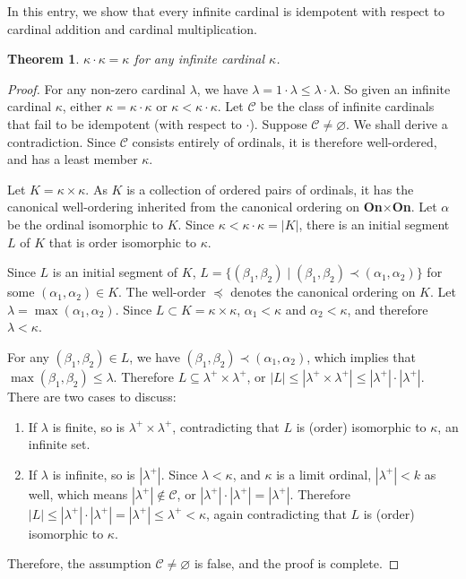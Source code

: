 \documentclass[12pt]{article}
\newtheorem{thm}{Theorem}
\begin{document}
In this entry, we show that every infinite cardinal is idempotent with respect to cardinal addition and cardinal multiplication.

\begin{thm} $\kappa\cdot \kappa = \kappa$ for any infinite cardinal $\kappa$. \end{thm}
\begin{proof} For any non-zero cardinal $\lambda$, we have $\lambda = 1\cdot \lambda \le \lambda \cdot \lambda$.  So given an infinite cardinal $\kappa$, either $\kappa = \kappa\cdot\kappa$ or $\kappa < \kappa \cdot \kappa$.  Let $\mathscr{C}$ be the class of infinite cardinals that fail to be idempotent (with respect to $\cdot$).  Suppose $\mathscr{C}\ne \varnothing$.  We shall derive a contradiction.  Since $\mathscr{C}$ consists entirely of ordinals, it is therefore well-ordered, and has a least member $\kappa$.

Let $K= \kappa \times \kappa$.  As $K$ is a collection of ordered pairs of ordinals, it has the canonical well-ordering inherited from the canonical ordering on \textbf{On}$\times$\textbf{On}.  Let $\alpha$ be the ordinal isomorphic to $K$.  Since $\kappa < \kappa \cdot \kappa = |K|$, there is an initial segment $L$ of $K$ that is order isomorphic to $\kappa$.

Since $L$ is an initial segment of $K$, $L=\lbrace (\beta_1,\beta_2) \mid (\beta_1,\beta_2) \prec (\alpha_1,\alpha_2) \rbrace$ for some $(\alpha_1,\alpha_2)\in K$.  The well-order $\preceq$ denotes the canonical ordering on $K$. Let $\lambda = \max(\alpha_1,\alpha_2)$.  Since $L \subset K = \kappa\times \kappa$, $\alpha_1<\kappa$ and $\alpha_2<\kappa$, and therefore $\lambda <\kappa$.

For any $(\beta_1,\beta_2)\in L$, we have $(\beta_1,\beta_2) \prec (\alpha_1,\alpha_2)$, which implies that $\max(\beta_1,\beta_2) \le \lambda$.  Therefore $L \subseteq \lambda^+ \times \lambda^+$, or $|L| \le |\lambda^+ \times \lambda^+|\le |\lambda^+|\cdot |\lambda^+|$.  There are two cases to discuss:
\begin{enumerate}
\item If $\lambda$ is finite, so is $\lambda^+ \times \lambda^+$, contradicting that $L$ is (order) isomorphic to $\kappa$, an infinite set.
\item If $\lambda$ is infinite, so is $|\lambda^+|$.  Since $\lambda <\kappa$, and $\kappa$ is a limit ordinal, $|\lambda^+|<k$ as well, which means $|\lambda^+|\notin \mathscr{C}$, or $|\lambda^+|\cdot |\lambda^+| = |\lambda^+|$.  Therefore $|L|\le |\lambda^+|\cdot |\lambda^+| = |\lambda^+|\le \lambda^+ < \kappa$, again contradicting that $L$ is (order) isomorphic to $\kappa$.
\end{enumerate}
Therefore, the assumption $\mathscr{C} \ne \varnothing$ is false, and the proof is complete.
\end{proof}
\end{document}
